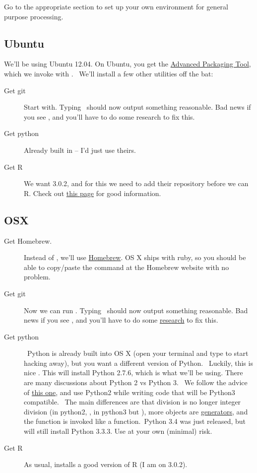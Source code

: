 Go to the appropriate section to set up your own environment for general 
purpose processing.
\subsection{Ubuntu}
We'll be using Ubuntu 12.04.  On Ubuntu, you get the 
\href{https://help.ubuntu.com/10.04/serverguide/apt-get.html}{Advanced Packaging Tool},
which we invoke with .  We'll install a 
few other utilities off the bat:
\begin{description}
  \item[Get git] Start with.
Typing  should now output something reasonable. Bad news if you see 
, and you'll have to do some research to fix
this. 
  \item[Get python]Already built in -- I'd just use theirs.
  \item[Get R] We want 3.0.2, and for this we need to add their repository 
  before we can  R. Check out 
  \href{http://cran.r-project.org/bin/linux/ubuntu/README}{this page} for 
  good information.
\end{description}

\subsection{OSX}
\begin{description}
  \item[Get Homebrew.] Instead of , we'll use 
  \href{http://brew.sh/}{Homebrew}. OS X ships with ruby, so you should be able 
  to copy/paste the command at the Homebrew website with no problem.
  \item[Get git] Now we can run
  .  Typing  should now output something 
  reasonable. Bad news if you see ,
  and you'll have to do some \href{http://stackoverflow.com}{research}
  to fix this. 
  \item[Get python] Python is already built into OS X (open your terminal and 
  type  to start hacking away), but you want a different version of
  Python.  Luckily, this is nice .  This will install 
  Python 2.7.6, which is what we'll be using. 
  There are many discussions about Python 2 vs Python 3.  We follow the advice of
  \href{http://stackoverflow.com/questions/11938786/new-project-python-2-or-python-3}{this one},
  and use Python2 while writing code that will be Python3 compatible.  The main 
  differences are that division is no longer integer division (in python2, 
  , in python3  but ), more objects are
  \href{http://www.jeffknupp.com/blog/2013/04/07/improve-your-python-yield-and-generators-explained/}{generators},
  and the  function is invoked like a function. Python 3.4 was just 
  released, but  will still install Python 3.3.3. Use
  at your own (minimal) risk.
  \item[Get R] As usual,  installs a good version of R 
  (I am on 3.0.2).
\end{description}

